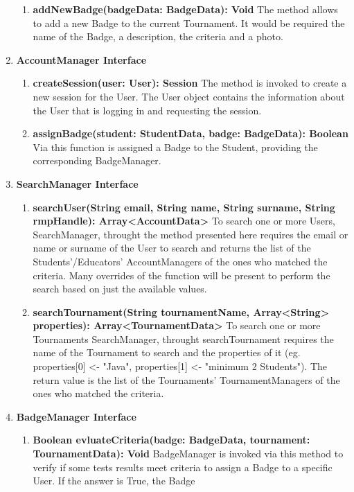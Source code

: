 \begin{enumerate}
\begin{enumerate}[label=$\bullet$]
            \item \textbf{addNewBadge(badgeData: BadgeData): Void} The method allows to add a new Badge to the current Tournament. It would be required the name of the Badge, a description, the criteria 
            and a photo.
        \end{enumerate}
    \item \textbf{AccountManager Interface} 
        \begin{enumerate}[label=$\bullet$]
            \item \textbf{createSession(user: User): Session} The method is invoked to create a new session for the User. The User object contains the information about the User that is logging in and requesting the session.
            \item \textbf{assignBadge(student: StudentData, badge: BadgeData): Boolean} Via this function is assigned a Badge to the Student, providing the corresponding BadgeManager.
        \end{enumerate}
    \item \textbf{SearchManager Interface} 
        \begin{enumerate}[label=$\bullet$]
            \item \textbf{searchUser(String email, String name, String surname, String rmpHandle): Array<AccountData>} To search one or more Users, SearchManager, throught the method presented here requires the email or name or surname
            of the User to search and returns the list of the Students'/Educators' AccountManagers of the ones who matched the criteria. Many overrides of the function will be present to perform the search based on just the available values.
            \item \textbf{searchTournament(String tournamentName, Array<String> properties): Array<TournamentData> } To search one or more Tournaments SearchManager, throught searchTournament requires the name of the Tournament 
            to search and the properties of it (eg. properties[0] <- "Java", properties[1] <- "minimum 2 Students"). The return value is the list of the Tournaments' TournamentManagers of the ones who matched the criteria.
        \end{enumerate}
    \item \textbf{BadgeManager Interface}
        \begin{enumerate}[label=$\bullet$]
            \item \textbf{Boolean evluateCriteria(badge: BadgeData, tournament: TournamentData): Void} BadgeManager is invoked via this method to verify if some tests results meet criteria to assign a Badge to a specific User. If the answer is True, the Badge

\end{enumerate}
\end{enumerate}
